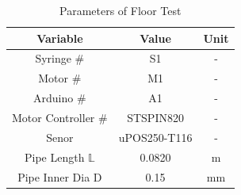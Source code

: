 \documentclass[journal]{IEEEtran}
\begin{document}
            \begin{table}[H]
                    \renewcommand{\arraystretch}{1.3}
                    \caption{Parameters of Floor Test}
                    \label{table:test_param_floor}
                        \begin{center}
                            \begin{tabular}{|c|c|c|}
                                \hline
                                \bfseries Variable&
                                \bfseries Value&
                                \bfseries Unit
                                \\ \hline
                                
                                Syringe \#&
                                S1&
                                -
                                \\ \hline
                                
                                Motor \#&
                                M1&
                                -
                                \\ \hline
                                
                                Arduino \#&
                                A1&
                                -
                                \\ \hline
                                
                                Motor Controller \#&
                                STSPIN820&
                                -
                                \\ \hline
                                
                                Senor&
                                uPOS250-T116&
                                -
                                \\ \hline
                                
                                Pipe Length \(\mathbb{L}\) &
                                0.0820&
                                m
                                \\ \hline
                                
                                Pipe Inner Dia D&
                                0.15&
                                mm
                                \\ \hline
                                

\end{tabular}
\end{center}
\end{table}
\end{document}
